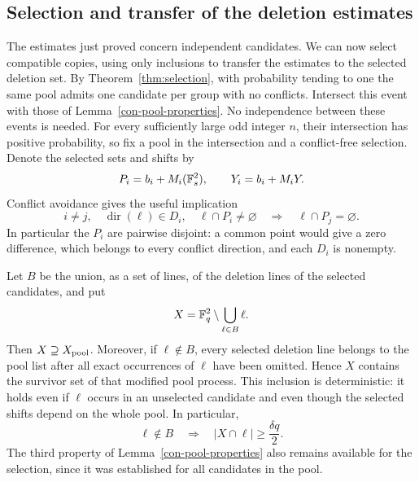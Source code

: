 \subsection{Selection and transfer of the deletion estimates}

The estimates just proved concern independent candidates.  We can now
select compatible copies, using only inclusions to transfer the
estimates to the selected deletion set.
By Theorem~\ref{thm:selection}, with probability tending to one the
same pool admits one candidate per group with no conflicts.
Intersect this event with those of Lemma~\ref{con-pool-properties}.
No independence between these events is needed.  For every
sufficiently large odd integer \(n\), their intersection has positive
probability, so fix a pool in the intersection and a conflict-free
selection.  Denote the selected sets and shifts by
\[
 P_i=b_i+M_i(\mathbb F_s^2),\qquad Y_i=b_i+M_iY.
\]
Conflict avoidance gives the useful implication
\begin{equation}
\label{con-separation}
 i\ne j,\quad \operatorname{dir}(\ell)\in D_i,\quad
 \ell\cap P_i\ne\varnothing
 \quad\Longrightarrow\quad \ell\cap P_j=\varnothing.
\end{equation}
In particular the \(P_i\) are pairwise disjoint: a common point
would give a zero difference, which belongs to every conflict
direction, and each \(D_i\) is nonempty.

Let \(B\) be the union, as a set of lines, of the deletion lines
of the selected candidates, and put
\begin{equation}
\label{con-selected-survivors}
 X=\mathbb F_q^2\setminus\bigcup_{\ell\in B}\ell.
\end{equation}
Then \(X\supseteq X_{\rm pool}\).  Moreover, if \(\ell\notin B\),
every selected deletion line belongs to the pool list after all
exact occurrences of \(\ell\) have been omitted.  Hence \(X\)
contains the survivor set of that modified pool process. This
inclusion is deterministic: it holds even if \(\ell\) occurs in an
unselected candidate and even though the selected shifts depend on the
whole pool. In particular,
\begin{equation}
\label{con-selected-line-bound}
 \ell\notin B
 \quad\Longrightarrow\quad |X\cap\ell|\ge\frac{\delta q}{2}.
\end{equation}
The third property of Lemma~\ref{con-pool-properties} also remains
available for the selection, since it was established for all
candidates in the pool.

